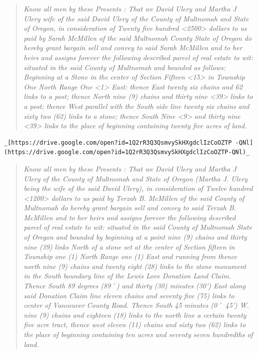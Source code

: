 \documentclass[
  12pt,
]{book}
\begin{document}
\begin{quote}
\emph{Know all men by these Presents : That we David Ulery and Martha J Ulery wife of the said David Ulery of the County of Multnomah and State of Oregon, in consideration of Twenty five hundred \textless2500\textgreater{} dollars to us paid by Sarah McMillen of the said Multnomah County State of Oregon do hereby grant bargain sell and convey to said Sarah McMillen and to her heirs and assigns forever the following described parcel of real estate to wit: situated in the said County of Multnomah and bounded as follows: Beginning at a Stone in the center of Section Fifteen \textless15\textgreater{} in Township One North Range One \textless1\textgreater{} East: thence East twenty six chains and 62 links to a post; thence North nine (9) chains and thirty nine \textless39\textgreater{} links to a post; thence West parallel with the South side line twenty six chains and sixty two (62) links to a stone; thence South Nine \textless9\textgreater{} and thirty nine \textless39\textgreater{} links to the place of beginning containing twenty five acres of land.}
\end{quote}

\begin{verbatim}
_[https://drive.google.com/open?id=1Q2rR3Q3QsmvySkHXgdclIzCoOZTP -QNl](https://drive.google.com/open?id=1Q2rR3Q3QsmvySkHXgdclIzCoOZTP-QNl)_
\end{verbatim}

\begin{quote}
\emph{Know all men by these Presents : That we David Ulery and Martha J Ulery of the County of Multnomah and State of Oregon (Martha J. Ulery being the wife of the said David Ulery), in consideration of Twelve hundred \textless1200\textgreater{} dollars to us paid by Terzah B. McMillen of the said County of Multnomah do hereby grant bargain sell and convey to said Terzah B. McMillen and to her heirs and assigns forever the following described parcel of real estate to wit: situated in the said County of Multnomah State of Oregon and bounded by beginning at a point nine (9) chains and thirty nine (39) links North of a stone set at the center of Section fifteen in Township one (1) North Range one (1) East and running from thence north nine (9) chains and twenty eight (28) links to the stone monument in the South boundary line of the Lewis Love Donation Land Claim. Thence South 89 degrees (89˚) and thirty (30) minutes (30') East along said Donation Claim line eleven chains and seventy five (75) links to center of Vancouver County Road. Thence South 45 minutes (0˚ 45') W. nine (9) chains and eighteen (18) links to the north line a certain twenty five acre tract, thence west eleven (11) chains and sixty two (62) links to the place of beginning containing ten acres and seventy seven hundredths of land.}
\end{quote}
\end{document}
